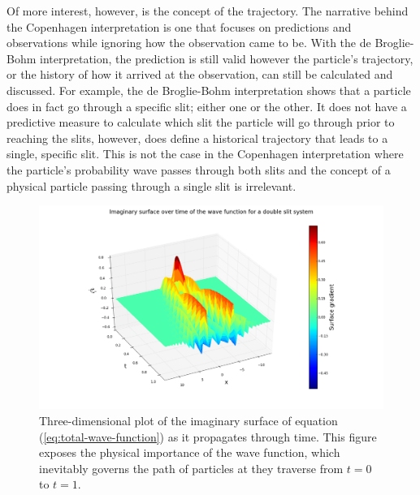 \documentclass[10pt, reqno]{article}
\begin{document}
  Of more interest, however, is the concept of the trajectory. 
  The narrative behind the Copenhagen interpretation is one that focuses on predictions and observations while ignoring how the observation came to be.
  With the de Broglie-Bohm interpretation, the prediction is still valid however the particle's trajectory, or the history of how it arrived at the observation, 
    can still be calculated and discussed.
  For example, the de Broglie-Bohm interpretation shows that a particle does in fact go through a specific slit; either one or the other.
  It does not have a predictive measure to calculate which slit the particle will go through prior to reaching the slits, however, does define 
    a historical trajectory that leads to a single, specific slit.
  This is not the case in the Copenhagen interpretation where 
    the particle's probability wave passes through both slits and the concept of a physical particle passing through a single slit is irrelevant.


    \begin{figure}[!ht]
      \centerline{\includegraphics[scale=.4]{./imgs/double-slit-real-imaginary-parts-3d.png}}
      \caption{
        Three-dimensional plot of the imaginary surface of equation (\ref{eq:total-wave-function}) as it propagates through time.
        This figure exposes the physical importance of the wave function, which inevitably governs the path of particles at they traverse from $t=0$
      to $t=1$.
      }
      \label{fig:3d}
    \end{figure}
\end{document}
